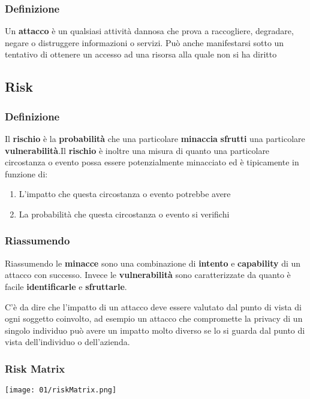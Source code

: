         \subsubsection{Definizione} Un \textbf{attacco} è un qualsiasi attività dannosa che prova a raccogliere, degradare, negare o distruggere informazioni o servizi. Può anche manifestarsi sotto un tentativo di ottenere un accesso ad una risorsa alla quale non si ha diritto 
    \subsection{Risk}
        \subsubsection{Definizione}
            Il \textbf{rischio} è la \textbf{probabilità} che una particolare \textbf{minaccia} \textbf{sfrutti} una particolare \textbf{vulnerabilità}.Il \textbf{rischio} è inoltre una misura di quanto una particolare circostanza o evento possa essere potenzialmente minacciato ed è tipicamente in funzione di: 
            \begin{enumerate}
                \item L'impatto che questa circostanza o evento potrebbe avere
                \item La probabilità che questa circostanza o evento si verifichi
            \end{enumerate}
        \subsubsection{Riassumendo}
            Riassumendo le \textbf{minacce} sono una combinazione di \textbf{intento} e \textbf{capability} di un attacco con successo. Invece le \textbf{vulnerabilità} sono caratterizzate da quanto è facile \textbf{identificarle} e \textbf{sfruttarle}.
            
            C'è da dire che l'impatto di un attacco deve essere valutato dal punto di vista di ogni soggetto coinvolto, ad esempio un attacco che compromette la privacy di un singolo individuo può avere un impatto molto diverso se lo si guarda dal punto di vista dell'individuo o dell'azienda.
        \subsubsection{Risk Matrix}
            \texttt{[image: 01/riskMatrix.png]}
            
